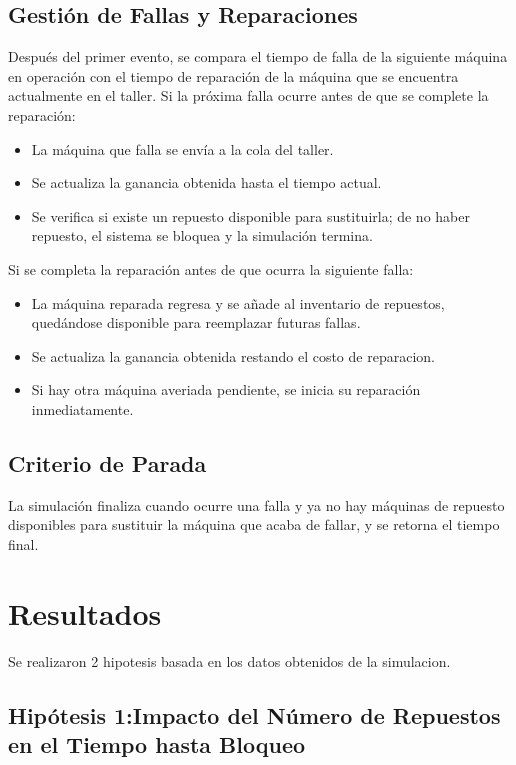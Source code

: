 \documentclass[a4paper,12pt]{article}
\begin{document}
			\subsection{Gestión de Fallas y Reparaciones}
			Después del primer evento, se compara el tiempo de falla de la siguiente máquina en operación con el tiempo de reparación de la máquina que se encuentra actualmente en el taller.
			\newline
			Si la próxima falla ocurre antes de que se complete la reparación:
			\begin{itemize}
				\item La máquina que falla se envía a la cola del taller.
				\item Se actualiza la ganancia obtenida hasta el tiempo actual.
				\item Se verifica si existe un repuesto disponible para sustituirla; de no haber repuesto, el sistema se bloquea y la simulación termina.
			\end{itemize}
			Si se completa la reparación antes de que ocurra la siguiente falla:
			\begin{itemize}
				\item La máquina reparada regresa y se añade al inventario de repuestos, quedándose disponible para reemplazar futuras fallas.
				\item Se actualiza la ganancia obtenida restando el costo de reparacion.
				\item Si hay otra máquina averiada pendiente, se inicia su reparación inmediatamente.
			\end{itemize}
			\subsection{Criterio de Parada}
			La simulación finaliza cuando ocurre una falla y ya no hay máquinas de repuesto disponibles para sustituir la máquina que acaba de fallar, y se retorna el tiempo final.
			
	\section{Resultados}
	Se realizaron 2 hipotesis basada en los datos obtenidos de la simulacion.
		
		\subsection{Hipótesis 1:Impacto del Número de Repuestos en el Tiempo hasta Bloqueo}
		
\end{document}
